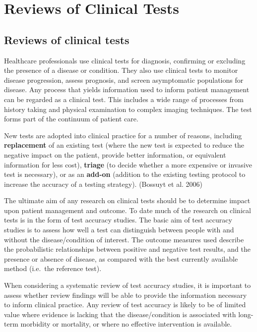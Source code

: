 \documentclass[
  11pt,
  a4paper,
  DIV=11,
  numbers=noendperiod]{scrreprt}
\begin{document}
\part{Reviews of Clinical Tests}

\chapter{Reviews of clinical tests}\label{reviews-of-clinical-tests-1}

Healthcare professionals use clinical tests for diagnosis, confirming or
excluding the presence of a disease or condition. They also use clinical
tests to monitor disease progression, assess prognosis, and screen
asymptomatic populations for disease. Any process that yields
information used to inform patient management can be regarded as a
clinical test. This includes a wide range of processes from history
taking and physical examination to complex imaging techniques. The test
forms part of the continuum of patient care.

New tests are adopted into clinical practice for a number of reasons,
including \textbf{replacement} of an existing test (where the new test
is expected to reduce the negative impact on the patient, provide better
information, or equivalent information for less cost), \textbf{triage}
(to decide whether a more expensive or invasive test is necessary), or
as an \textbf{add-on} (addition to the existing testing protocol to
increase the accuracy of a testing strategy). (Bossuyt et al. 2006)

The ultimate aim of any research on clinical tests should be to
determine impact upon patient management and outcome. To date much of
the research on clinical tests is in the form of test accuracy studies.
The basic aim of test accuracy studies is to assess how well a test can
distinguish between people with and without the disease/condition of
interest. The outcome measures used describe the probabilistic
relationships between positive and negative test results, and the
presence or absence of disease, as compared with the best currently
available method (i.e.~the reference test).

When considering a systematic review of test accuracy studies, it is
important to assess whether review findings will be able to provide the
information necessary to inform clinical practice. Any review of test
accuracy is likely to be of limited value where evidence is lacking that
the disease/condition is associated with long-term morbidity or
mortality, or where no effective intervention is available.
\end{document}
